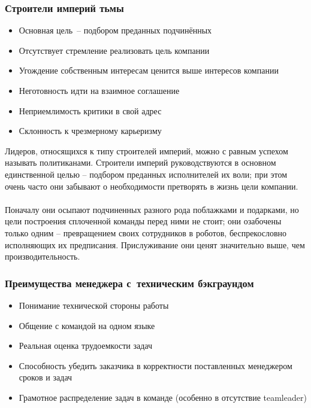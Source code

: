 \documentclass{../industrial-development}
\begin{document}
{\begin{frame} \frametitle{Строители империй тьмы }
\begin{itemize}
		\item Основная цель~– подбором преданных подчинённых
		\item Отсутствует стремление реализовать цель компании
		\item Угождение собственным интересам ценится выше интересов компании
		\item Неготовность идти на взаимное соглашение
		\item Неприемлимость критики в свой адрес
		\item Склонность к чрезмерному карьеризму
	\end{itemize}
 
\end{frame}
\lecturenotes
Лидеров, относящихся к типу строителей империй, можно с равным успехом называть политиканами. Строители империй руководствуются в основном единственной целью – подбором преданных исполнителей их воли; при этом очень часто они забывают о необходимости претворять в жизнь цели компании. \\~\\
Поначалу они осыпают подчиненных разного рода поблажками и подарками, но цели построения сплоченной команды перед ними не стоит; они озабочены только одним – превращением своих сотрудников в роботов, беспрекословно исполняющих их предписания. Прислуживание они ценят значительно выше, чем производительность.




\begin{frame} \frametitle{Преимущества менеджера с~техническим бэкграундом}
	 \begin{itemize}
                      \item Понимание технической стороны работы
		\item Общение с командой на одном языке
		\item Реальная оценка трудоемкости задач
		\item Способность убедить заказчика в корректности поставленных менеджером сроков и задач
		\item Грамотное распределение задач в команде (особенно в отсутствие teamleader)
	\end{itemize} 	
\end{frame}
\lecturenotes



}
\end{document}
